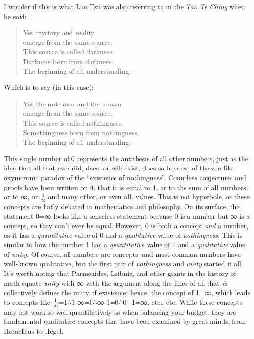 \documentclass[
]{article}
\begin{document}
I wonder if this is what Lao Tzu was also referring to in the \emph{Tao
Te Ching} when he said:

\begin{quote}
Yet mystery and reality \\
emerge from the same source. \\
This source is called darkness. \\
Darkness born from darkness. \\
The beginning of all understanding.
\end{quote}

Which is to say (in this case):

\begin{quote}
Yet the unknown and the known \\
emerge from the same source. \\
This source is called nothingness. \\
Somethingness born from nothingness. \\
The beginning of all understanding.
\end{quote}

This single number of 0 represents the antithesis of all other numbers,
just as the idea that all that ever did, does, or will exist, does so
because of the zen-like oxymoronic paradox of the ``existence of
nothingness''. Countless conjectures and proofs have been written on 0;
that it is equal to 1, or to the sum of all numbers, or to ∞, or
\(\frac{1}{\infty}\) and many other, or even all, values. This is not
hyperbole, as these concepts are hotly debated in mathematics and
philosophy. On its surface, the statement 0=∞ looks like a senseless
statement because 0 is a number but ∞ is a concept, so they can't ever
be equal. However, 0 is both a concept \emph{and} a number, as it has a
\emph{quantitative} value of 0 and a \emph{qualitative} value of
\emph{nothingness}. This is similar to how the number 1 has a
\emph{quantitative} value of 1 and a \emph{qualitative} value of
\emph{unity}. Of course, all numbers are concepts, and most common
numbers have well-known qualitative, but the first pair of
\emph{nothingness} and \emph{unity} started it all. It's worth noting
that Parmenides, Leibniz, and other giants in the history of math equate
\emph{unity} with ∞ with the argument along the lines of all that
\emph{is} collectively defines the unity of existence; hence, the
concept of 1=∞, which leads to concepts like
\(\frac{1}{\infty}\)=1∴1-∞=0∴∞-1=0∴0+1=∞, etc., etc. While these
concepts may not work so well quantitatively as when balancing your
budget, they are fundamental qualitative concepts that have been
examined by great minds, from Heraclitus to Hegel.
\end{document}

